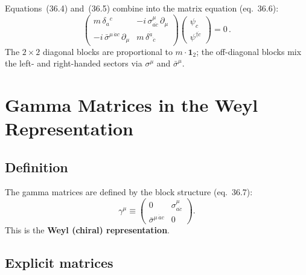 Equations~(36.4) and~(36.5) combine into the matrix equation (eq.~36.6):
\begin{equation}
  \begin{pmatrix}
    m\,\delta_a{}^c & -i\,\sigma^\mu_{a\dot{c}}\,\partial_\mu \\
    -i\,\bar{\sigma}^{\mu\,\dot{a}c}\,\partial_\mu & m\,\delta^{\dot{a}}{}_{\dot{c}}
  \end{pmatrix}
  \begin{pmatrix} \psi_c \\ \psi^{\dagger\dot{c}} \end{pmatrix}
  = 0\,.
  \tag{36.6}
\end{equation}
The $2\times 2$ diagonal blocks are proportional to $m\cdot\mathbf{1}_2$;
the off-diagonal blocks mix the left- and right-handed sectors via $\sigma^\mu$
and $\bar{\sigma}^\mu$.

\section{Gamma Matrices in the Weyl Representation}

\subsection{Definition}

The gamma matrices are defined by the block structure (eq.~36.7):
\begin{equation}
  \gamma^\mu \equiv
  \begin{pmatrix}
    0 & \sigma^\mu_{a\dot{c}} \\
    \bar{\sigma}^{\mu\,\dot{a}c} & 0
  \end{pmatrix}.
  \tag{36.7}
\end{equation}
This is the \textbf{Weyl (chiral) representation}.

\subsection{Explicit matrices}

